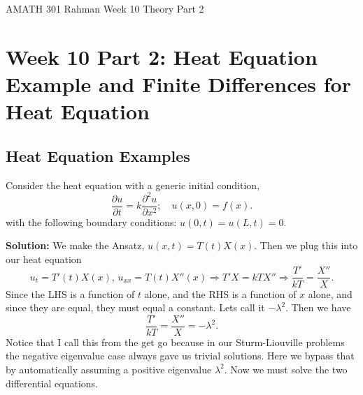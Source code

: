 \documentclass[reqno]{amsart}
\theoremstyle{definition}
\begin{document}
\begin{flushleft}
{\sc \Large AMATH 301 Rahman} \hfill Week 10 Theory Part 2
\bigskip
\end{flushleft}

\newcommand{\R}{\mathbb{R}}
\newcommand{\N}{\mathbb{N}}
\newcommand{\Z}{\mathbb{Z}}
\newcommand{\Q}{\mathbb{Q}}
\renewcommand{\CancelColor}{\color{red}}
\newcommand{\?}{\stackrel{?}{=}}
\renewcommand{\varphi}{\phi}
\newcommand{\card}{\text{Card}}
\newcommand{\bigzero}{\text{\Huge 0}}
\newcommand{\curvearrowdown}{{\color{red}\rotatebox{90}{$\curvearrowleft$}}}
\newcommand{\curvearrowup}{{\color{red}\rotatebox{90}{$\curvearrowright$}}}
\renewcommand{\L}{\mathcal{L}}
\newcommand{\xvect}{\overrightarrow{x}}
\newcommand{\vect}{\overrightarrow{v}}
\newcommand{\wvect}{\overrightarrow{w}}
\newcommand{\nuvect}{\overrightarrow{\nu}}
\newcommand{\omegavect}{\overrightarrow{\omega}}
\newcommand{\del}{\nabla}


\section*{Week 10 Part 2:  Heat Equation Example and Finite Differences for Heat Equation}

\subsection*{Heat Equation Examples}

Consider the heat equation with a generic initial condition,
%
\begin{equation}
\frac{\partial u}{\partial t} = k\frac{\partial^2 u}{\partial x^2};\quad
u(x,0) = f(x).
\end{equation}
%
with the following boundary conditions: $u(0,t) = u(L,t) = 0$.

\textbf{Solution:  }  We make the Ansatz, $u(x,t) = T(t)X(x)$.  Then we plug this
into our heat equation
%
\begin{equation*}
u_t = T'(t)X(x),\, u_{xx} = T(t)X''(x) \Rightarrow T'X = kTX''
\Rightarrow \frac{T'}{kT} = \frac{X''}{X}.
\end{equation*}
%
Since the LHS is a function of $t$ alone, and the RHS is a function of $x$ alone,
and since they are equal, they must equal a constant.  Lets call it $-\lambda^2$.
Then we have
%
\begin{equation}
\frac{T'}{kT} = \frac{X''}{X} = -\lambda^2.
\end{equation}
%
Notice that I call this from the get go because in our Sturm-Liouville problems
the negative eigenvalue case always gave us trivial solutions.  Here we bypass
that by automatically assuming a positive eigenvalue $\lambda^2$.  Now we must
solve the two differential equations.
\end{document}
